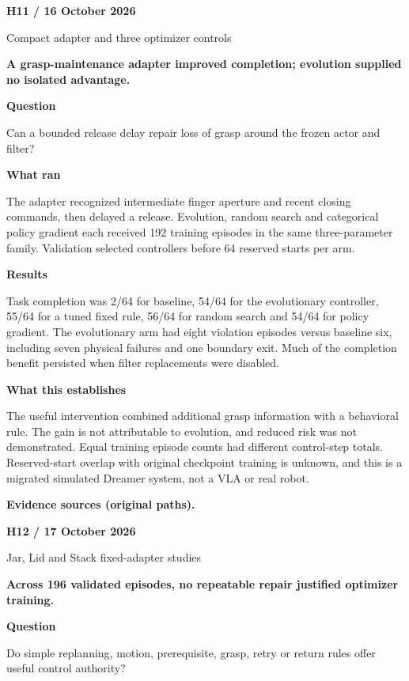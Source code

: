\documentclass[11pt,a4paper]{article}
\newcommand{\block}[2]{\par\textbf{\color{ink}#1}\par\nopagebreak #2\par}
\newcommand{\finding}[1]{\begin{tcolorbox}[colback=pale,colframe=pale,boxrule=0pt,arc=1mm,left=10pt,right=10pt,top=10pt,bottom=10pt]\color{ink}\large\bfseries #1\end{tcolorbox}}
\begin{document}
\clearpage
{}\label{exp:H11}
{\color{accent}\small\bfseries H11 / 16 October 2026}\par
{}\par
{\color{muted}\small Compact adapter and three optimizer controls}\par\vspace{2mm}
\finding{A grasp-maintenance adapter improved completion; evolution supplied no isolated advantage.}
\block{Question}{Can a bounded release delay repair loss of grasp around the frozen actor and filter?}
\block{What ran}{The adapter recognized intermediate finger aperture and recent closing commands, then delayed a release. Evolution, random search and categorical policy gradient each received 192 training episodes in the same three-parameter family. Validation selected controllers before 64 reserved starts per arm.}
\block{Results}{Task completion was 2/64 for baseline, 54/64 for the evolutionary controller, 55/64 for a tuned fixed rule, 56/64 for random search and 54/64 for policy gradient. The evolutionary arm had eight violation episodes versus baseline six, including seven physical failures and one boundary exit. Much of the completion benefit persisted when filter replacements were disabled.}
\block{What this establishes}{The useful intervention combined additional grasp information with a behavioral rule. The gain is not attributable to evolution, and reduced risk was not demonstrated. Equal training episode counts had different control-step totals. Reserved-start overlap with original checkpoint training is unknown, and this is a migrated simulated Dreamer system, not a VLA or real robot.}
\vfill{\footnotesize\color{muted}\textbf{Evidence sources (original paths).}\par
\raggedright {}}
\clearpage
{}\label{exp:H12}
{\color{accent}\small\bfseries H12 / 17 October 2026}\par
{}\par
{\color{muted}\small Jar, Lid and Stack fixed-adapter studies}\par\vspace{2mm}
\finding{Across 196 validated episodes, no repeatable repair justified optimizer training.}
\block{Question}{Do simple replanning, motion, prerequisite, grasp, retry or return rules offer useful control authority?}
\end{document}
